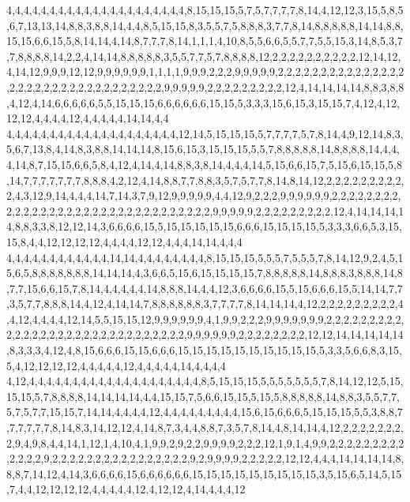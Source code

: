 4,4,4,4,4,4,4,4,4,4,4,4,4,4,4,4,4,4,4,4,4,8,15,15,15,5,7,5,7,7,7,7,8,14,4,12,12,3,15,5,8,5,6,7,13,13,14,8,8,3,8,8,14,4,4,8,5,15,15,8,3,5,5,7,5,8,8,8,3,7,7,8,14,8,8,8,8,8,14,14,8,8,15,15,6,6,15,5,8,14,14,4,14,8,7,7,7,8,14,1,1,1,4,10,8,5,5,6,6,5,5,7,7,5,5,15,3,14,8,5,3,7,7,8,8,8,8,14,2,2,4,14,14,8,8,8,8,8,3,5,5,7,7,5,7,8,8,8,8,12,2,2,2,2,2,2,2,2,2,2,12,14,12,4,14,12,9,9,9,12,12,9,9,9,9,9,9,1,1,1,1,9,9,9,2,2,2,9,9,9,9,9,2,2,2,2,2,2,2,2,2,2,2,2,2,2,2,2,2,2,2,2,2,2,2,2,2,2,2,2,2,2,2,2,2,9,9,9,9,9,2,2,2,2,2,2,2,2,2,12,4,14,14,14,14,8,8,3,8,8,4,12,4,14,6,6,6,6,6,5,5,15,15,15,6,6,6,6,6,6,15,15,5,3,3,3,15,6,15,3,15,15,7,4,12,4,12,12,12,4,4,4,4,12,4,4,4,4,4,14,14,4,4
4,4,4,4,4,4,4,4,4,4,4,4,4,4,4,4,4,4,4,4,12,14,5,15,15,15,5,7,7,7,7,5,7,8,14,4,9,12,14,8,3,5,6,7,13,8,4,14,8,3,8,8,14,14,14,8,15,6,15,3,15,15,15,5,5,7,8,8,8,8,8,14,8,8,8,8,14,4,4,4,14,8,7,15,15,6,6,5,8,4,12,4,14,4,14,8,8,3,8,14,4,4,4,14,5,15,6,6,15,7,5,15,6,15,15,5,8,14,7,7,7,7,7,7,7,8,8,8,4,2,12,4,14,8,8,7,7,8,8,3,5,7,5,7,7,8,14,8,14,12,2,2,2,2,2,2,2,2,2,2,4,3,12,9,14,4,4,4,14,7,14,3,7,9,12,9,9,9,9,9,4,4,12,9,2,2,2,9,9,9,9,9,9,2,2,2,2,2,2,2,2,2,2,2,2,2,2,2,2,2,2,2,2,2,2,2,2,2,2,2,2,2,2,2,2,9,9,9,9,9,2,2,2,2,2,2,2,2,2,12,4,14,14,14,14,8,8,3,3,8,12,12,14,3,6,6,6,6,15,5,15,15,15,15,15,6,6,6,15,15,15,15,5,3,3,3,6,6,5,3,15,15,8,4,4,12,12,12,12,4,4,4,4,12,12,4,4,4,14,14,4,4,4
4,4,4,4,4,4,4,4,4,4,4,4,14,14,4,4,4,4,4,4,4,4,8,15,15,15,5,5,5,7,5,5,5,7,8,14,12,9,2,4,5,15,6,5,8,8,8,8,8,8,8,14,14,14,4,3,6,6,5,15,6,15,15,15,15,7,8,8,8,8,8,14,8,8,8,3,8,8,8,14,8,7,7,15,6,6,15,7,8,14,4,4,4,4,4,14,8,8,8,14,4,4,12,3,6,6,6,6,15,5,15,6,6,6,15,5,14,14,7,7,3,5,7,7,8,8,8,14,4,12,4,14,14,7,8,8,8,8,8,8,3,7,7,7,7,8,14,14,14,4,12,2,2,2,2,2,2,2,2,2,4,4,12,4,4,4,4,12,14,5,5,15,15,12,9,9,9,9,9,9,4,1,9,9,2,2,2,9,9,9,9,9,9,9,2,2,2,2,2,2,2,2,2,2,2,2,2,2,2,2,2,2,2,2,2,2,2,2,2,2,2,2,2,2,9,9,9,9,9,9,2,2,2,2,2,2,2,2,12,12,14,14,14,14,14,8,3,3,3,4,12,4,8,15,6,6,6,15,15,6,6,6,15,15,15,15,15,15,15,15,15,15,5,3,3,5,6,6,8,3,15,5,4,12,12,12,12,4,4,4,4,4,12,4,4,4,4,4,14,4,4,4,4
4,12,4,4,4,4,4,4,4,4,4,4,4,4,4,4,4,4,4,4,4,4,8,5,15,15,15,5,5,5,5,5,5,5,7,8,14,12,12,5,15,15,15,5,7,8,8,8,8,14,14,14,14,4,4,15,15,7,5,6,6,15,15,5,15,5,8,8,8,8,8,14,8,8,3,5,5,7,7,5,7,5,7,7,15,15,7,14,14,4,4,4,4,12,4,4,4,4,4,4,4,4,4,15,6,15,6,6,6,5,15,15,15,5,5,3,8,8,7,7,7,7,7,7,8,14,8,3,14,12,12,4,14,8,7,3,4,4,8,8,7,3,5,7,8,14,4,8,14,14,4,12,2,2,2,2,2,2,2,2,9,4,9,8,4,4,14,1,12,1,4,10,4,1,9,9,2,9,2,2,9,9,9,9,2,2,2,12,1,9,1,4,9,9,2,2,2,2,2,2,2,2,2,2,2,2,2,9,2,2,2,2,2,2,2,2,2,2,2,2,2,2,2,2,9,2,9,9,9,9,2,2,2,2,2,12,12,4,4,4,14,14,14,14,8,8,8,7,14,12,4,14,3,6,6,6,6,15,6,6,6,6,6,6,15,15,15,15,15,15,15,15,15,3,5,15,6,5,14,5,15,7,4,4,12,12,12,12,4,4,4,4,4,12,4,12,12,4,14,4,4,4,12
